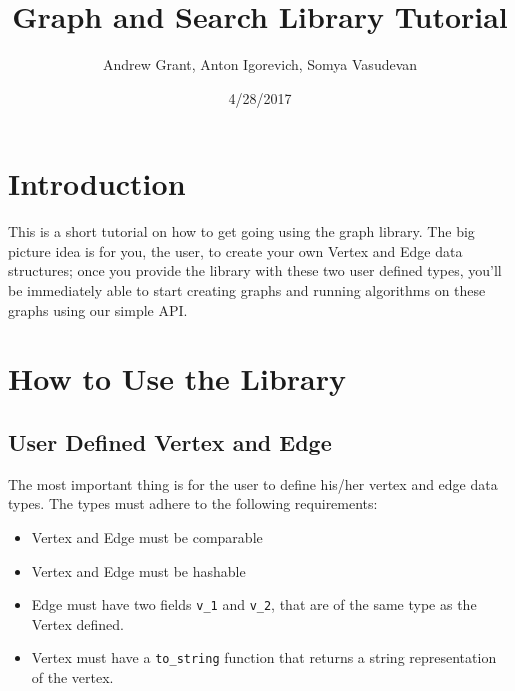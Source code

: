 \documentclass{article}
\title{Graph and Search Library Tutorial}
\author{Andrew Grant,  Anton Igorevich, Somya Vasudevan}
\date{4/28/2017}
\begin{document}
\maketitle

\section{Introduction}
This is a short tutorial on how to get going using the graph library. The big picture idea is for you, the user, to create your own Vertex and Edge data structures; once you provide the library with these two user defined types, you'll be immediately able to start creating graphs and running algorithms on these graphs using our simple API.

\section{How to Use the Library}
\subsection{User Defined Vertex and Edge}
The most important thing is for the user to define his/her vertex and edge data types. The types must adhere to the following requirements:
\begin{itemize}
\item Vertex and Edge must be comparable
\item Vertex and Edge must be hashable
\item Edge must have two fields \texttt{v\_1} and \texttt{v\_2}, that are of the same type as the Vertex defined.
\item Vertex must have a \texttt{to\_string} function that returns a string representation of the vertex. 
\end{itemize}
\end{document}
